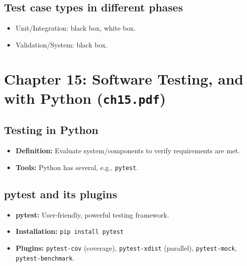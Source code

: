 \documentclass[11pt,a4paper]{article}
\begin{document}
\subsection*{Test case types in different phases}
\begin{itemize}
    \item Unit/Integration: black box, white box.
    \item Validation/System: black box.
\end{itemize}

\section{Chapter 15: Software Testing, and with Python (\texttt{ch15.pdf})}

\subsection*{Testing in Python}
\begin{itemize}
    \item \textbf{Definition:} Evaluate system/components to verify requirements are met.
    \item \textbf{Tools:} Python has several, e.g., \texttt{pytest}.
\end{itemize}

\subsection*{pytest and its plugins}
\begin{itemize}
    \item \textbf{pytest:} User-friendly, powerful testing framework.
    \item \textbf{Installation:} \verb|pip install pytest|
    \item \textbf{Plugins:} \texttt{pytest-cov} (coverage), \texttt{pytest-xdist} (parallel), \texttt{pytest-mock}, \texttt{pytest-benchmark}.
\end{itemize}
\end{document}
